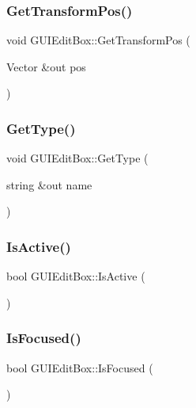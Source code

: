 \subsubsection{\texorpdfstring{Get\+Transform\+Pos()}{GetTransformPos()}}
{\footnotesize\ttfamily void G\+U\+I\+Edit\+Box\+::\+Get\+Transform\+Pos (\begin{DoxyParamCaption}\item[{Vector \&out}]{pos }\end{DoxyParamCaption})}

\hypertarget{class_g_u_i_edit_box_a1753fafb38c651d67fb2b8b33b4d5845}{}\label{class_g_u_i_edit_box_a1753fafb38c651d67fb2b8b33b4d5845} 
\subsubsection{\texorpdfstring{Get\+Type()}{GetType()}}
{\footnotesize\ttfamily void G\+U\+I\+Edit\+Box\+::\+Get\+Type (\begin{DoxyParamCaption}\item[{string \&out}]{name }\end{DoxyParamCaption})}

\hypertarget{class_g_u_i_edit_box_ae9a25ccf09a1d90efc3df7b5a3e2eb8c}{}\label{class_g_u_i_edit_box_ae9a25ccf09a1d90efc3df7b5a3e2eb8c} 
\subsubsection{\texorpdfstring{Is\+Active()}{IsActive()}}
{\footnotesize\ttfamily bool G\+U\+I\+Edit\+Box\+::\+Is\+Active (\begin{DoxyParamCaption}{ }\end{DoxyParamCaption})}

\hypertarget{class_g_u_i_edit_box_acf10d8dee3af3214741f6cab271e5c61}{}\label{class_g_u_i_edit_box_acf10d8dee3af3214741f6cab271e5c61} 
\subsubsection{\texorpdfstring{Is\+Focused()}{IsFocused()}}
{\footnotesize\ttfamily bool G\+U\+I\+Edit\+Box\+::\+Is\+Focused (\begin{DoxyParamCaption}{ }\end{DoxyParamCaption})}

